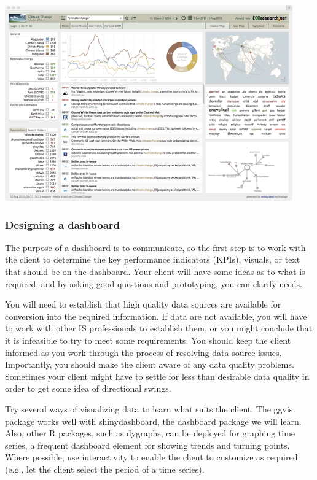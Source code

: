 \documentclass[
]{article}
\begin{document}
\includegraphics{Figures/Chapter 19/climate-dashboard.png}

\hypertarget{designing-a-dashboard}{%
\subsubsection*{Designing a dashboard}\label{designing-a-dashboard}}

The purpose of a dashboard is to communicate, so the first step is to
work with the client to determine the key performance indicators (KPIs),
visuals, or text that should be on the dashboard. Your client will have
some ideas as to what is required, and by asking good questions and
prototyping, you can clarify needs.

You will need to establish that high quality data sources are available
for conversion into the required information. If data are not available,
you will have to work with other IS professionals to establish them, or
you might conclude that it is infeasible to try to meet some
requirements. You should keep the client informed as you work through
the process of resolving data source issues. Importantly, you should
make the client aware of any data quality problems. Sometimes your
client might have to settle for less than desirable data quality in
order to get some idea of directional swings.

Try several ways of visualizing data to learn what suits the client. The
ggvis package works well with shinydashboard, the dashboard package we
will learn. Also, other R packages, such as dygraphs, can be deployed
for graphing time series, a frequent dashboard element for showing
trends and turning points. Where possible, use interactivity to enable
the client to customize as required (e.g., let the client select the
period of a time series).
\end{document}
